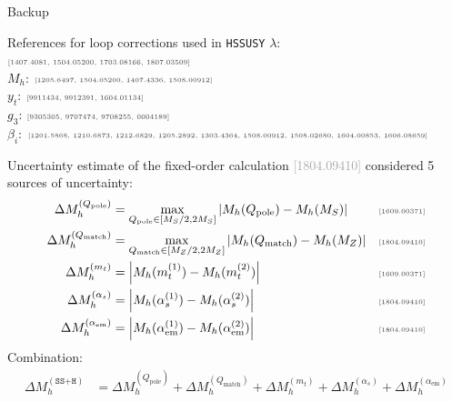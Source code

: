 \documentclass[hyperref={pdfpagelabels=false},ngerman]{beamer}
\newcommand{\MS}{\ensuremath{M_S}}
\newcommand{\mycite}[1]{\ensuremath{\text{\textcolor{darkgray}{\tiny [#1]}}}}
\newcommand{\bigcite}[1]{\textcolor{darkgray}{[#1]}}
\newcommand{\as}{\alpha_s}
\newcommand{\aem}{\alpha_\text{em}}
\newcommand{\Qpole}{\ensuremath{Q_\text{pole}}}
\newcommand{\Qmatch}{\ensuremath{Q_\text{match}}}
\newcommand{\DMh}{\ensuremath{\Delta M_h^{(\texttt{SS+H})}}}
\newcommand{\DMhQpole}{\ensuremath{\Delta M_h^{(\Qpole)}}}
\newcommand{\DMhQmatch}{\ensuremath{\Delta M_h^{(\Qmatch)}}}
\newcommand{\DMhMt}{\ensuremath{\Delta M_h^{(m_t)}}}
\newcommand{\DMhAlphaS}{\ensuremath{\Delta M_h^{(\as)}}}
\newcommand{\DMhAlphaEm}{\ensuremath{\Delta M_h^{(\aem)}}}
\def\HSSUSY{\texttt{HSSUSY}}
\begin{document}
\begin{frame}[noframenumbering]
  \begin{center}
    \Huge Backup
  \end{center}
\end{frame}

\begin{frame}[noframenumbering]{References for loop corrections used in \HSSUSY}
  $\lambda$: \mycite{1407.4081, 1504.05200, 1703.08166, 1807.03509}\\
  $M_h$: \mycite{1205.6497, 1504.05200, 1407.4336, 1508.00912}\\
  $y_t$: \mycite{9911434, 9912391, 1604.01134}\\
  $g_3$: \mycite{9305305, 9707474, 9708255, 0004189}\\
  $\beta_i$: \mycite{1201.5868, 1210.6873, 1212.6829, 1205.2892, 1303.4364, 1508.00912, 1508.02680, 1604.00853, 1606.08659}
\end{frame}

\begin{frame}[noframenumbering]{Uncertainty estimate of the fixed-order calculation}
  \bigcite{1804.09410} considered 5 sources of uncertainty:
  \begin{align*}
    \DMhQpole &= \max_{\Qpole\in[\MS/2,2\MS]}\left|M_h(\Qpole) - M_h(\MS)\right| & \text{\mycite{1609.00371}} \\
    \DMhQmatch &= \max_{\Qmatch\in[M_Z/2,2M_Z]}\left|M_h(\Qmatch) - M_h(M_Z)\right| & \text{\mycite{1804.09410}} \\
    \DMhMt &= \left|M_h(m_t^{(1)}) - M_h(m_t^{(2)})\right| & \text{\mycite{1609.00371}} \\
    \DMhAlphaS &= \left| M_h(\as^{(1)}) - M_h(\as^{(2)}) \right| & \text{\mycite{1804.09410}} \\
    \DMhAlphaEm &= \left| M_h(\aem^{(1)}) - M_h(\aem^{(2)}) \right| & \text{\mycite{1804.09410}}
  \end{align*}
  Combination:
  \begin{align*}
    \DMh &= \DMhQpole + \DMhQmatch + \DMhMt + \DMhAlphaS + \DMhAlphaEm 
  \end{align*}
\end{frame}
\end{document}

